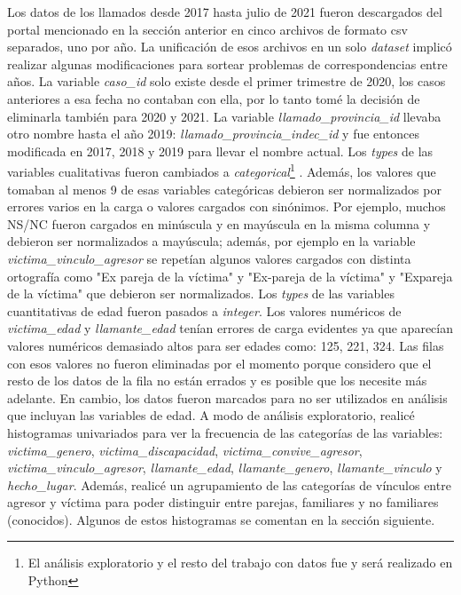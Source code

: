 \documentclass[10 pt]{article}
\begin{document}
Los datos de los llamados desde 2017 hasta julio de 2021 fueron descargados del portal mencionado en la sección anterior en cinco archivos de formato csv separados, uno por año. La unificación de esos archivos en un solo \textit{dataset} implicó realizar algunas modificaciones para sortear problemas de correspondencias entre años. La variable \textit{caso\_id} solo existe desde el primer trimestre de 2020, los casos anteriores a esa fecha no contaban con ella, por lo tanto tomé la decisión de eliminarla también para 2020 y 2021. La variable \textit{llamado\_provincia\_id} llevaba otro nombre hasta el año 2019: \textit{llamado\_provincia\_indec\_id} y fue entonces modificada en 2017, 2018 y 2019 para llevar el nombre actual. 
\newline
Los \textit{types} de las variables cualitativas fueron cambiados a \textit{categorical}\footnote{El análisis exploratorio y el resto del trabajo con datos fue y será realizado en Python} . Además, los valores que tomaban al menos 9 de esas variables categóricas debieron ser normalizados por errores varios en la carga o valores cargados con sinónimos. Por ejemplo, muchos NS/NC fueron cargados en minúscula y en mayúscula en la misma columna y debieron ser normalizados a mayúscula; además, por ejemplo en la variable \textit{victima\_vinculo\_agresor} se repetían algunos valores cargados con distinta ortografía como "Ex pareja de la víctima" y "Ex-pareja de la víctima" y "Expareja de la víctima" que debieron ser normalizados.
Los \textit{types} de las variables cuantitativas de edad fueron pasados a \textit{integer}. Los valores numéricos de \textit{victima\_edad} y \textit{llamante\_edad} tenían errores de carga evidentes ya que aparecían valores numéricos demasiado altos para ser edades como: 125, 221, 324. Las filas con esos valores no fueron eliminadas por el momento porque considero que el resto de los datos de la fila no están errados y es posible que los necesite más adelante. En cambio, los datos fueron marcados para no ser utilizados en análisis que incluyan las variables de edad.
A modo de análisis exploratorio, realicé histogramas univariados para ver la frecuencia de las categorías de las variables: \textit{victima\_genero}, \textit{victima\_discapacidad}, \textit{victima\_convive\_agresor}, \textit{victima\_vinculo\_agresor}, \textit{llamante\_edad}, \textit{llamante\_genero}, \textit{llamante\_vinculo} y \textit{hecho\_lugar}. Además, realicé un agrupamiento de las categorías de vínculos entre agresor y víctima para poder distinguir entre parejas, familiares y no familiares (conocidos). Algunos de estos histogramas se comentan en la sección siguiente. 
\end{document}
